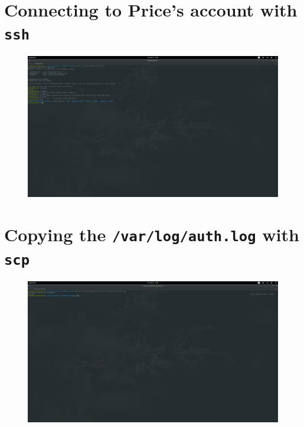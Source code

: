 \documentclass[12pt]{report}
\begin{document}
\section{Connecting to Price's account with \texttt{ssh}}
\label{app:screenshots:2}
\begin{figure}[H]
  \centering
  \includegraphics[width=0.7\paperheight, angle=-90]{It's_Elementary_my_dear_Watson!-2017-12-19-15-19-29}
\end{figure}
\section{Copying the \texttt{/var/log/auth.log} with \texttt{scp}}
\label{app:screenshots:3}
\begin{figure}[H]
  \centering
  \includegraphics[width=0.7\paperheight, angle=-90]{It's_Elementary_my_dear_Watson!-2017-12-19-15-59-43}
\end{figure}
\end{document}
